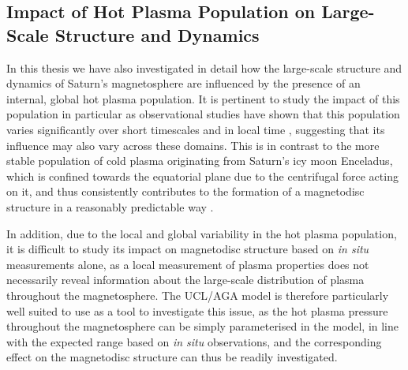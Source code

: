 \subsection{Impact of Hot Plasma Population on Large-Scale Structure and Dynamics}
In this thesis we have also investigated in detail how the large-scale structure and dynamics of Saturn's magnetosphere are influenced by the presence of an internal, global hot plasma population. It is pertinent to study the impact of this population in particular as observational studies have shown that this population varies significantly over short timescales \citep{sergis2011} and in local time \citep{sergis2017}, suggesting that its influence may also vary across these domains. This is in contrast to the more stable population of cold plasma originating from Saturn's icy moon Enceladus, which is confined towards the equatorial plane due to the centrifugal force acting on it, and thus consistently contributes to the formation of a magnetodisc structure in a reasonably predictable way \citep[e.g.][]{arridge2008}. 

In addition, due to the local and global variability in the hot plasma population, it is difficult to study its impact on magnetodisc structure based on \textit{in situ} measurements alone, as a local measurement of plasma properties does not necessarily reveal information about the large-scale distribution of plasma throughout the magnetosphere. The UCL/AGA model is therefore particularly well suited to use as a tool to investigate this issue, as the hot plasma pressure throughout the magnetosphere can be simply parameterised in the model, in line with the expected range based on \textit{in situ} observations, and the corresponding effect on the magnetodisc structure can thus be readily investigated. 

